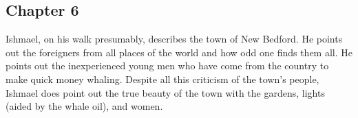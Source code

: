\subsection{Chapter 6}

Ishmael, on his walk presumably, describes the town of New Bedford. He points
out the foreigners from all places of the world and how odd one finds them all.
He points out the inexperienced young men who have come from the country to
make quick money whaling. Despite all this criticism of the town's people,
Ishmael does point out the true beauty of the town with the gardens, lights
(aided by the whale oil), and women.
